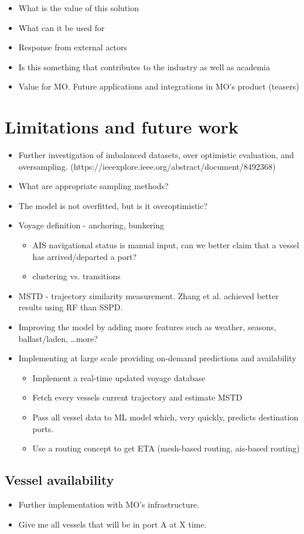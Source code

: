 \begin{itemize}
    \item What is the value of this solution
    \item What can it be used for
    \item Response from external actors
    \item Is this something that contributes to the industry as well as academia
    \item Value for MO\@. Future applications and integrations in MO's product (teasers)
\end{itemize}

\section{Limitations and future work}

\begin{itemize}
    \item Further investigation of imbalanced datasets, over optimistic evaluation, and oversampling. (https://ieeexplore.ieee.org/abstract/document/8492368)
    \item What are appropriate sampling methods?
    \item The model is not overfitted, but is it overoptimistic?
\end{itemize}

\begin{itemize}
    \item Voyage definition - anchoring, bunkering
\begin{itemize}
    \item AIS navigational status is manual input, can we better claim that a vessel has arrived/departed a port?
    \item clustering vs. transitions
\end{itemize}
    \item MSTD - trajectory similarity measurement. Zhang et al. achieved better results using RF than SSPD.
    \item Improving the model by adding more features such as weather, seasons, ballast/laden, \ldots more?
    \item Implementing at large scale providing on-demand predictions and availability
\begin{itemize}
    \item Implement a real-time updated voyage database
    \item Fetch every vessels current trajectory and estimate MSTD
    \item Pass all vessel data to ML model which, very quickly, predicts destination ports.
    \item Use a routing concept to get ETA (mesh-based routing, ais-based routing)
\end{itemize}
\end{itemize}

\subsection{Vessel availability}
\begin{itemize}
    \item Further implementation with MO's infrastructure.
    \item Give me all vessels that will be in port A at X time.
\end{itemize}
